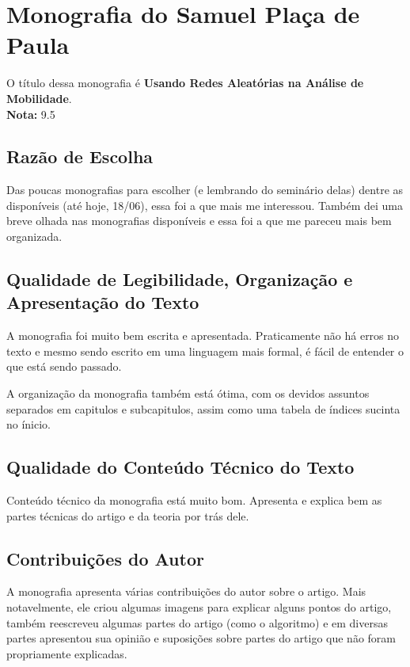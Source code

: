 




\cabecalho

\section{Monografia do Samuel Plaça de Paula}
O título dessa monografia é \textbf{Usando Redes Aleatórias na Análise de Mobilidade}.\\

\textbf{Nota:} 9.5

\subsection{Razão de Escolha}
Das poucas monografias para escolher (e lembrando do seminário delas) dentre as disponíveis (até hoje, 18/06),
essa foi a que mais me interessou. Também dei uma breve olhada nas monografias disponíveis e essa
foi a que me pareceu mais bem organizada.

\subsection{Qualidade de Legibilidade, Organização e Apresentação do Texto}
A monografia foi muito bem escrita e apresentada. Praticamente não há erros no texto e mesmo sendo
escrito em uma linguagem mais formal, é fácil de entender o que está sendo passado.

A organização da monografia também está ótima, com os devidos assuntos separados em capitulos e
subcapitulos, assim como uma tabela de índices sucinta no ínicio.

\subsection{Qualidade do Conteúdo Técnico do Texto}
Conteúdo técnico da monografia está muito bom. Apresenta e explica bem as partes técnicas do artigo
e da teoria por trás dele.

\subsection{Contribuições do Autor} %
A monografia apresenta várias contribuições do autor sobre o artigo. Mais notavelmente, ele criou algumas
imagens para explicar alguns pontos do artigo, também reescreveu algumas partes do artigo (como o algoritmo)
e em diversas partes apresentou sua opinião e suposições sobre partes do artigo que não foram propriamente
explicadas.

